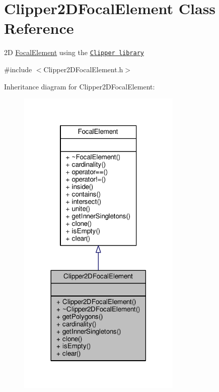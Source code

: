 \hypertarget{classClipper2DFocalElement}{}\section{Clipper2\+D\+Focal\+Element Class Reference}
\label{classClipper2DFocalElement}


2\+D \hyperlink{classFocalElement}{Focal\+Element} using the \href{http://www.angusj.com/delphi/clipper.php}{\tt Clipper library}  




{\ttfamily \#include $<$Clipper2\+D\+Focal\+Element.\+h$>$}



Inheritance diagram for Clipper2\+D\+Focal\+Element\+:\nopagebreak
\begin{figure}[H]
\begin{center}
\leavevmode
\includegraphics[width=221pt]{classClipper2DFocalElement__inherit__graph}
\end{center}
\end{figure}


